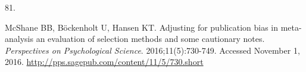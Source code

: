 \documentclass[
  american,
  man, donotrepeattitle,floatsintext]{apa7}
\newlength{\cslhangindent}
\newlength{\csllabelwidth}
\newenvironment{CSLReferences}[2] %
 {\begin{list}{}{%
  \setlength{\itemindent}{0pt}
  \setlength{\leftmargin}{0pt}
  \setlength{\parsep}{0pt}
  \ifodd #1
   \setlength{\leftmargin}{\cslhangindent}
   \setlength{\itemindent}{-1\cslhangindent}
  \fi
  \setlength{\itemsep}{#2\baselineskip}}}
 {\end{list}}
\newcommand{\CSLLeftMargin}[1]{\parbox[t]{\csllabelwidth}{\strut#1\strut}}
\newcommand{\CSLRightInline}[1]{\parbox[t]{\linewidth - \csllabelwidth}{\strut#1\strut}}
\begin{document}
\begin{CSLReferences}{0}{1}
\CSLLeftMargin{81. }%
\CSLRightInline{McShane BB, Böckenholt U, Hansen KT. Adjusting for publication bias in meta-analysis an evaluation of selection methods and some cautionary notes. \emph{Perspectives on Psychological Science}. 2016;11(5):730-749. Accessed November 1, 2016. \url{http://pps.sagepub.com/content/11/5/730.short}}

\end{CSLReferences}

\endgroup
\end{document}
